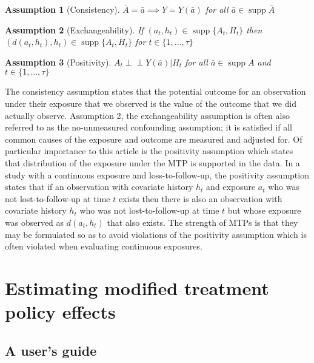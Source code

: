 \documentclass[]{jss}
\begin{document}
\newtheorem{assumption}{Assumption}

\begin{assumption}[Consistency]
\(\bar{A} = \bar{a} \implies Y = Y(\bar{a})\) for all $\bar{a} \in \mathop{\mathrm{supp}}\bar{A}$ 
\end{assumption}
\begin{assumption}[Exchangeability]
If $(a_t, h_t) \in \mathop{\mathrm{supp}}\{A_t, H_t\}$ then $(d(a_t, h_t), h_t) \in \mathop{\mathrm{supp}}\{A_t, H_t\}$ for $t \in \{1, ..., \tau \}$
\end{assumption}
\begin{assumption}[Positivity]
$A_t \perp \!\!\! \perp Y(\bar{a}) | H_t$ for all $\bar{a} \in \mathop{\mathrm{supp}}\bar{A}$ and $t \in \{1, ..., \tau\}$
\end{assumption}

The consistency assumption states that the potential outcome for an
observation under their exposure that we observed is the value of the
outcome that we did actually observe. Assumption 2, the exchangeability
assumption is often also referred to as the no-unmeasured confounding
assumption; it is satisfied if all common causes of the exposure and
outcome are measured and adjusted for. Of particular importance to this
article is the positivity assumption which states that distribution of
the exposure under the MTP is supported in the data. In a study with a
continuous exposure and loss-to-follow-up, the positivity assumption
states that if an observation with covariate history \(h_t\) and
exposure \(a_t\) who was not lost-to-follow-up at time \(t\) exists then
there is also an observation with covariate history \(h_t\) who was not
lost-to-follow-up at time \(t\) but whose exposure was observed as
\(d(a_t, h_t)\) that also exists. The strength of MTPs is that they may
be formulated so as to avoid violations of the positivity assumption
which is often violated when evaluating continuous exposures.

\hypertarget{estimating-modified-treatment-policy-effects}{%
\section{Estimating modified treatment policy
effects}\label{estimating-modified-treatment-policy-effects}}

\hypertarget{a-users-guide}{%
\subsection{A user's guide}\label{a-users-guide}}
\end{document}

